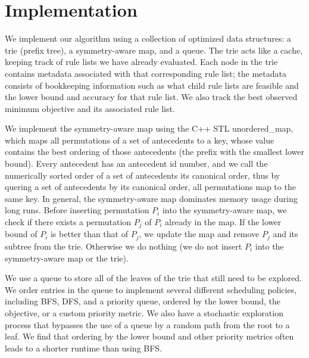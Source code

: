 \section{Implementation}
\label{sec:implementation}



We implement our algorithm using a collection of optimized data structures:
a trie (prefix tree), a symmetry-aware map, and a queue.
The trie acts like a cache, keeping track of rule lists we have already evaluated.
Each node in the trie contains metadata associated with that corresponding rule list;
the metadata consists of bookkeeping information such as what child rule lists are feasible and
the lower bound and accuracy for that rule list.
We also track the best observed minimum objective and its associated rule list.

We implement the symmetry-aware map using the C++ STL unordered\_map, which
maps all permutations of a set of antecedents to a key, whose value
contains the best ordering of those antecedents (\ie the prefix with the smallest lower bound).
Every antecedent has an antecedent id number, and we call the numerically
sorted order of a set of antecedents its canonical order, thus
by quering a set of antecedents by its canonical order, all
permutations map to the same key.
%
%
In general, the symmetry-aware map dominates memory usage during long runs.
Before inserting permutation $P_i$ into the symmetry-aware map, we check
if there exists a permutation $P_j$ of $P_i$ already in the map.
If the lower bound of $P_i$ is better than that of $P_j$,
we update the map and remove $P_j$ and its subtree from the trie.
Otherwise we do nothing (\ie we do not insert $P_i$ into the symmetry-aware map
or the trie).

We use a queue to store all of the leaves of the trie that still need to be explored.
We order entries in the queue to implement several different scheduling policies,
including BFS, DFS, and a priority queue, ordered by the lower bound, the objective,
or a custom priority metric.
We also have a stochastic exploration process that bypasses the use of a queue by
a random path from the root to a leaf.
We find that ordering by the lower bound and other priority metrics
often leads to a shorter runtime than using BFS.


